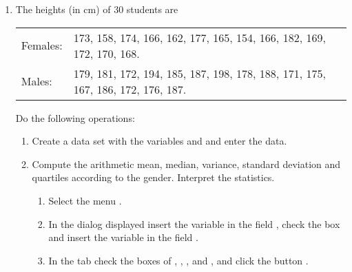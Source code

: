 \begin{enumerate}[leftmargin=*]
\item The heights (in cm) of 30 students are 
\begin{center}
\begin{tabular}{ll}
Females: & 173, 158, 174, 166, 162, 177, 165, 154, 166, 182, 169, 172, 170, 168. \\
Males: & 179, 181, 172, 194, 185, 187, 198, 178, 188, 171, 175, 167, 186, 172, 176, 187.
\end{tabular}
\end{center}

Do the following operations:
\begin{enumerate}
\item Create a data set with the variables  and  and enter the data.

\item Compute the arithmetic mean, median, variance, standard deviation and quartiles according to the gender.
Interpret the statistics.
\begin{indication}
\begin{enumerate}
\item Select the menu .
\item In the dialog displayed insert the variable  in the field ,
check the box  and insert the variable  in the field .
\item In the  tab check the boxes of , ,
,  and , and click the button .
\end{enumerate}
\end{indication}
\end{enumerate}

\end{enumerate}


